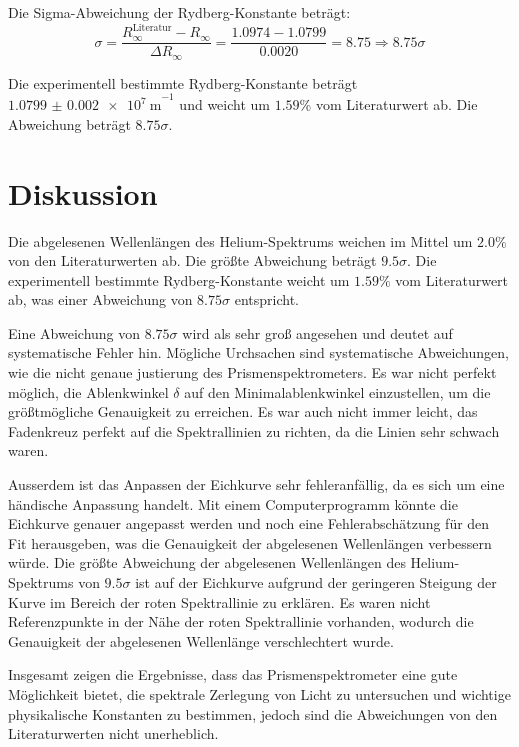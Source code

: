 \documentclass[12pt,a4paper,titlepage]{scrartcl}
\numberwithin{equation}{section}
\numberwithin{table}{section}
\numberwithin{figure}{section}
\begin{document}
Die Sigma-Abweichung der Rydberg-Konstante beträgt:
\begin{equation}
    \sigma = \frac{R_\infty^{\text{Literatur}} - R_\infty}{\Delta R_\infty} = \frac{1.0974 - 1.0799}{0.0020} =  8.75\Rightarrow 8.75\sigma
\end{equation}

\begin{resultbox}[Ergebnis]
    Die experimentell bestimmte Rydberg-Konstante beträgt $\qty{1.0799(20)e7}{\text{m}}^{-1}$ und weicht um $1.59\%$ vom Literaturwert ab. Die Abweichung beträgt $8.75\sigma$.
\end{resultbox}


\section{Diskussion}
Die abgelesenen Wellenlängen des Helium-Spektrums weichen im Mittel um $2.0\%$ von den Literaturwerten ab. Die größte Abweichung beträgt $9.5\sigma$. 
Die experimentell bestimmte Rydberg-Konstante weicht um $1.59\%$ vom Literaturwert ab, was einer Abweichung von $8.75\sigma$ entspricht. 

Eine Abweichung von $8.75\sigma$ wird als sehr groß angesehen und deutet auf systematische Fehler hin.
Mögliche Urchsachen sind systematische Abweichungen, wie die nicht genaue justierung des Prismenspektrometers. Es war nicht perfekt möglich, die Ablenkwinkel $\delta$ auf den Minimalablenkwinkel einzustellen, um die größtmögliche Genauigkeit zu erreichen. Es war auch nicht immer leicht, das Fadenkreuz perfekt auf die Spektrallinien zu richten, da die Linien sehr schwach waren. 

Ausserdem ist das Anpassen der Eichkurve sehr fehleranfällig, da es sich um eine händische Anpassung handelt. Mit einem Computerprogramm könnte die Eichkurve genauer angepasst werden und noch eine Fehlerabschätzung für den Fit herausgeben, was die Genauigkeit der abgelesenen Wellenlängen verbessern würde. Die größte Abweichung der abgelesenen Wellenlängen des Helium-Spektrums von $9.5\sigma$ ist auf der Eichkurve aufgrund der geringeren Steigung der Kurve im Bereich der roten Spektrallinie zu erklären. Es waren nicht Referenzpunkte in der Nähe der roten Spektrallinie vorhanden, wodurch die Genauigkeit der abgelesenen Wellenlänge verschlechtert wurde.

Insgesamt zeigen die Ergebnisse, dass das Prismenspektrometer eine gute Möglichkeit bietet, die spektrale Zerlegung von Licht zu untersuchen und wichtige physikalische Konstanten zu bestimmen, jedoch sind die Abweichungen von den Literaturwerten nicht unerheblich.
\end{document}

